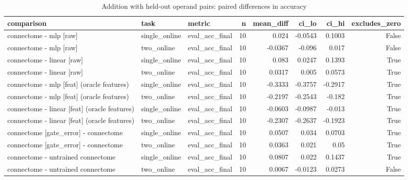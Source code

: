 \begin{table}[t]
\centering
\small
\begin{tabular}{lllrrrrr}
\toprule
comparison & task & metric & n & mean\_diff & ci\_lo & ci\_hi & excludes\_zero \\
\midrule
connectome - mlp [raw] & single\_online & eval\_acc\_final & 10 & 0.024 & -0.0543 & 0.1003 & False \\
connectome - mlp [raw] & two\_online & eval\_acc\_final & 10 & -0.0367 & -0.096 & 0.017 & False \\
connectome - linear [raw] & single\_online & eval\_acc\_final & 10 & 0.083 & 0.0247 & 0.1393 & True \\
connectome - linear [raw] & two\_online & eval\_acc\_final & 10 & 0.0317 & 0.005 & 0.0573 & True \\
connectome - mlp [feat] (oracle features) & single\_online & eval\_acc\_final & 10 & -0.3333 & -0.3757 & -0.2917 & True \\
connectome - mlp [feat] (oracle features) & two\_online & eval\_acc\_final & 10 & -0.2197 & -0.2543 & -0.182 & True \\
connectome - linear [feat] (oracle features) & single\_online & eval\_acc\_final & 10 & -0.0603 & -0.0987 & -0.013 & True \\
connectome - linear [feat] (oracle features) & two\_online & eval\_acc\_final & 10 & -0.2307 & -0.2637 & -0.1923 & True \\
connectome [gate\_error] - connectome & single\_online & eval\_acc\_final & 10 & 0.0507 & 0.034 & 0.0703 & True \\
connectome [gate\_error] - connectome & two\_online & eval\_acc\_final & 10 & 0.0363 & 0.021 & 0.05 & True \\
connectome - untrained connectome & single\_online & eval\_acc\_final & 10 & 0.0807 & 0.022 & 0.1437 & True \\
connectome - untrained connectome & two\_online & eval\_acc\_final & 10 & 0.0067 & -0.0123 & 0.0273 & False \\
\bottomrule
\end{tabular}
\caption{Addition with held-out operand pairs: paired differences in accuracy}
\label{tab:disjoint_addition_paired}
\end{table}